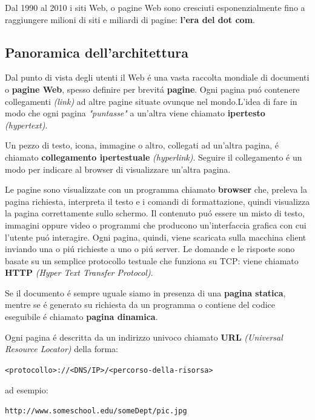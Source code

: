 \documentclass[12pt]{article}
\def\code#1{\texttt{#1}}
\begin{document}
Dal 1990 al 2010 i siti Web, o pagine Web sono cresciuti esponenzialmente fino a raggiungere milioni di siti e miliardi di pagine: 
\textbf{l'era del dot com}.

\subsection{Panoramica dell'architettura}\label{web-http-panoramica-architettura}
Dal punto di vista degli utenti il Web \'e una vasta raccolta mondiale di documenti o \textbf{pagine Web}, spesso definire per 
brevit\'a \textbf{pagine}. Ogni pagina pu\'o contenere collegamenti \textit{(link)} ad altre pagine situate ovunque nel 
mondo.L'idea di fare in modo che ogni pagina \textit{"puntasse"} a un'altra viene chiamato \textbf{ipertesto} \textit{(hypertext)}.

Un pezzo di testo, icona, immagine o altro, collegati ad un'altra pagina, \'e chiamato \textbf{collegamento ipertestuale} 
\textit{(hyperlink)}. Seguire il collegamento \'e un modo per indicare al browser di visualizzare un'altra pagina.

Le pagine sono visualizzate con un programma chiamato \textbf{browser} che, preleva la pagina richiesta, interpreta il testo e i 
comandi di formattazione, quindi visualizza la pagina correttamente sullo schermo. Il contenuto pu\'o essere un misto di testo, 
immagini oppure video o programmi che producono un'interfaccia grafica con cui l'utente pu\'o interagire. Ogni pagina, quindi, viene 
scaricata sulla macchina client inviando una o pi\'u richieste a uno o pi\'u server. Le domande e le risposte sono basate su un 
semplice protocollo testuale che funziona su TCP: viene chiamato \textbf{HTTP} \textit{(Hyper Text Transfer Protocol)}.

Se il documento \'e sempre uguale siamo in presenza di una \textbf{pagina statica}, mentre se \'e generato su richiesta da un 
programma o contiene del codice eseguibile \'e chiamato \textbf{pagina dinamica}.

Ogni pagina \'e descritta da un indirizzo univoco chiamato \textbf{URL} \textit{(Universal Resource Locator)} della forma:
\begin{center}
	\code{<protocollo>://<DNS/IP>/<percorso-della-risorsa>}
\end{center}
ad esempio:
\begin{center}
	\code{http://www.someschool.edu/someDept/pic.jpg}
\end{center}
\end{document}
